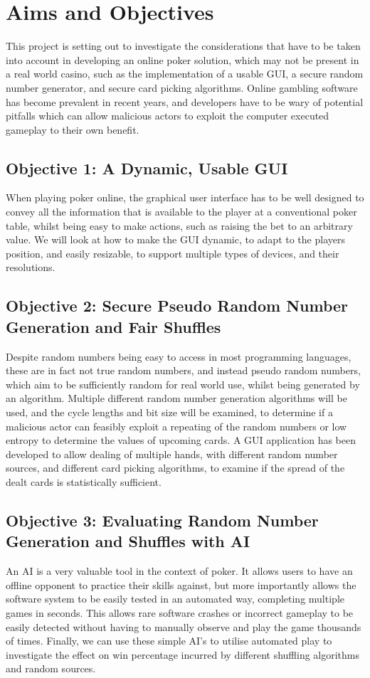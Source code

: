 \section{Aims and Objectives}
This project is setting out to investigate the considerations that have to be
taken into account in developing an online poker solution, which may not be
present in a real world casino, such as the implementation of a usable GUI, 
a secure random number generator, and secure card picking algorithms. Online 
gambling software has become prevalent in recent years, and developers have to 
be wary of potential pitfalls which can allow malicious actors to exploit the 
computer executed gameplay to their own benefit.

\subsection{Objective 1: A Dynamic, Usable GUI}
When playing poker online, the graphical user interface has to be well designed
to convey all the information that is available to the player at a conventional
poker table, whilst being easy to make actions, such as raising the bet to
an arbitrary value. We will look at how to make the GUI dynamic, to adapt to
the players position, and easily resizable, to support multiple types of devices,
and their resolutions.

\subsection{Objective 2: Secure Pseudo Random Number Generation and Fair Shuffles}
Despite random numbers being easy to access in most programming languages, 
these are in fact not true random numbers, and instead pseudo random numbers, 
which aim to be sufficiently random for real world use, whilst being generated 
by an algorithm. Multiple different random number generation algorithms will
be used, and the cycle lengths and bit size will be examined, to determine if 
a malicious actor can feasibly exploit a repeating of the random numbers or 
low entropy to determine the values of upcoming cards. A GUI application has
been developed to allow dealing of multiple hands, with different random number
sources, and different card picking algorithms, to examine if the spread of
the dealt cards is statistically sufficient. 

\subsection{Objective 3: Evaluating Random Number Generation and Shuffles with AI}
An AI is a very valuable tool in the context of poker. It allows users to have
an offline opponent to practice their skills against, but more importantly
allows the software system to be easily tested in an automated way, completing
multiple games in seconds. This allows rare software crashes or incorrect
gameplay to be easily detected without having to manually observe and play
the game thousands of times. Finally, we can use these simple AI's to utilise
automated play to investigate the effect on win percentage incurred by
different shuffling algorithms and random sources.
